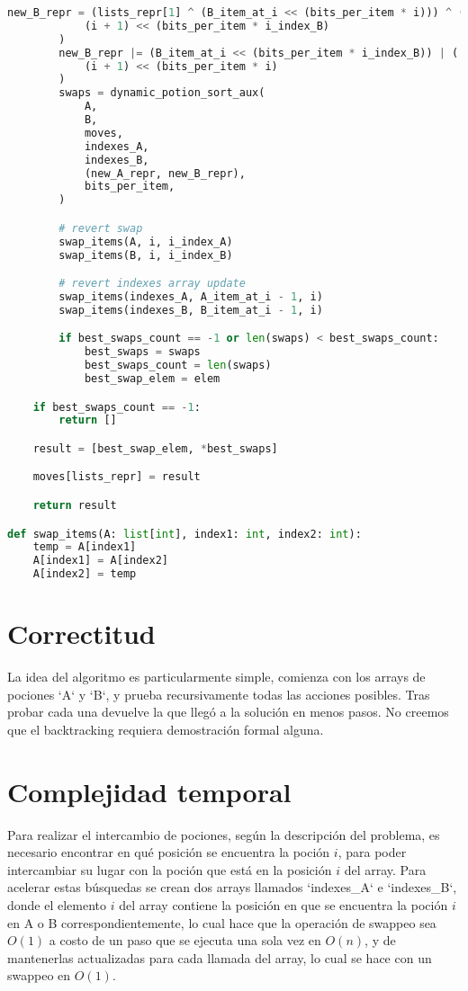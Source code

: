 \documentclass{article}
\begin{document}
\begin{lstlisting}[language=Python]
        new_B_repr = (lists_repr[1] ^ (B_item_at_i << (bits_per_item * i))) ^ (
            (i + 1) << (bits_per_item * i_index_B)
        )
        new_B_repr |= (B_item_at_i << (bits_per_item * i_index_B)) | (
            (i + 1) << (bits_per_item * i)
        )
        swaps = dynamic_potion_sort_aux(
            A,
            B,
            moves,
            indexes_A,
            indexes_B,
            (new_A_repr, new_B_repr),
            bits_per_item,
        )

        # revert swap
        swap_items(A, i, i_index_A)
        swap_items(B, i, i_index_B)

        # revert indexes array update
        swap_items(indexes_A, A_item_at_i - 1, i)
        swap_items(indexes_B, B_item_at_i - 1, i)

        if best_swaps_count == -1 or len(swaps) < best_swaps_count:
            best_swaps = swaps
            best_swaps_count = len(swaps)
            best_swap_elem = elem

    if best_swaps_count == -1:
        return []

    result = [best_swap_elem, *best_swaps]

    moves[lists_repr] = result

    return result

def swap_items(A: list[int], index1: int, index2: int):
    temp = A[index1]
    A[index1] = A[index2]
    A[index2] = temp
\end{lstlisting}

\section*{Correctitud}

La idea del algoritmo es particularmente simple, comienza con los arrays de pociones `A` y `B`, y prueba recursivamente todas las acciones posibles. Tras probar cada una devuelve la que llegó a la solución en menos pasos. No creemos que el backtracking requiera demostración formal alguna.


\section*{Complejidad temporal}

Para realizar el intercambio de pociones, según la descripción del problema, es necesario encontrar en qué posición se encuentra la poción $i$, para poder intercambiar su lugar con la poción que está en la posición $i$ del array. Para acelerar estas búsquedas se crean dos arrays llamados `indexes_A` e `indexes_B`, donde el elemento $i$ del array contiene la posición en que se encuentra la poción $i$ en A o B correspondientemente, lo cual hace que la operación de swappeo sea $O(1)$ a costo de un paso que se ejecuta una sola vez en $O(n)$, y de mantenerlas actualizadas para cada llamada del array, lo cual se hace con un swappeo en $O(1)$.
\end{document}
